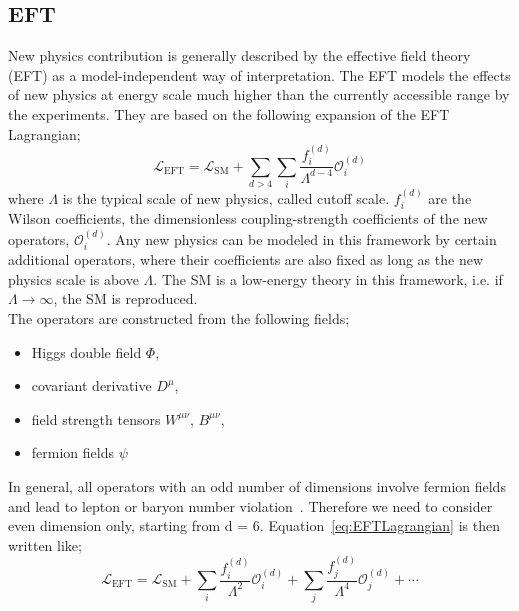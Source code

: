 \subsection{EFT}
\label{subsec:EFT}
New physics contribution is generally described by the effective field theory (EFT) as a model-independent way of interpretation.
The EFT models the effects of new physics at energy scale much higher than the currently accessible range by the experiments. 
They are based on the following expansion of the EFT Lagrangian;
\begin{equation}
\label{eq:EFTLagrangian}
\mathcal{L}_{\mathrm{EFT}}=\mathcal{L}_{\mathrm{SM}}+\sum_{d>4} \sum_{i} \frac{f_{i}^{(d)}}{\Lambda^{d-4}} \mathcal{O}_{i}^{(d)}
\end{equation}
where $\Lambda$ is the typical scale of new physics, called cutoff scale. $f_{i}^{(d)}$ are the Wilson coefficients, the dimensionless coupling-strength coefficients of the new operators, $\mathcal{O}_{i}^{(d)}$.
Any new physics can be modeled in this framework by certain additional operators, where their coefficients are also fixed as long as the new physics scale is above $\Lambda$. 
The SM is a low-energy theory in this framework, i.e. if $\Lambda \rightarrow \infty$, the SM is reproduced.
\\
The operators are constructed from the following fields;
\begin{itemize}
    \item Higgs double field $\Phi$,
    \item covariant derivative $D^{\mu}$,
    \item field strength tensors $W^{\mu\nu}$, $B^{\mu\nu}$,
    \item fermion fields $\psi$
\end{itemize}
In general, all operators with an odd number of dimensions involve fermion fields and lead to lepton or baryon number violation~\cite{PhysRevLett.43.1566}. Therefore we need to consider even dimension only, starting from d = 6.
Equation~\ref{eq:EFTLagrangian} is then written like;
\begin{equation}
\label{eq:EFTLagrangian2}
\mathcal{L}_{\mathrm{EFT}}=\mathcal{L}_{\mathrm{SM}} + \sum_{i} \frac{f_{i}^{(d)}}{\Lambda^{2}} \mathcal{O}_{i}^{(d)} +  \sum_{j} \frac{f_{j}^{(d)}}{\Lambda^{4}} \mathcal{O}_{j}^{(d)} + \cdots
\end{equation}
